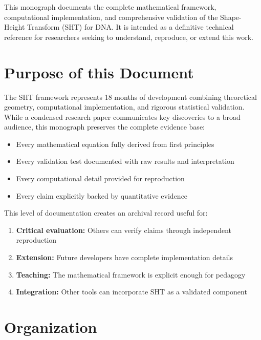 
This monograph documents the complete mathematical framework, computational implementation, and comprehensive validation of the Shape-Height Transform (SHT) for DNA. It is intended as a definitive technical reference for researchers seeking to understand, reproduce, or extend this work.

\section*{Purpose of this Document}

The SHT framework represents 18 months of development combining theoretical geometry, computational implementation, and rigorous statistical validation. While a condensed research paper communicates key discoveries to a broad audience, this monograph preserves the complete evidence base:

\begin{itemize}
    \item Every mathematical equation fully derived from first principles
    \item Every validation test documented with raw results and interpretation
    \item Every computational detail provided for reproduction
    \item Every claim explicitly backed by quantitative evidence
\end{itemize}

This level of documentation creates an archival record useful for:
\begin{enumerate}
    \item \textbf{Critical evaluation:} Others can verify claims through independent reproduction
    \item \textbf{Extension:} Future developers have complete implementation details
    \item \textbf{Teaching:} The mathematical framework is explicit enough for pedagogy
    \item \textbf{Integration:} Other tools can incorporate SHT as a validated component
\end{enumerate}

\section*{Organization}

